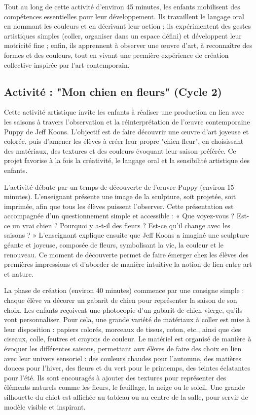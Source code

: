\documentclass[12pt]{article}
\begin{document}
Tout au long de cette activité d’environ 45 minutes, les enfants mobilisent des compétences essentielles pour leur développement. Ils travaillent le langage oral en nommant les couleurs et en décrivant leur action ; ils expérimentent des gestes artistiques simples (coller, organiser dans un espace défini) et développent leur motricité fine ; enfin, ils apprennent à observer une œuvre d’art, à reconnaître des formes et des couleurs, tout en vivant une première expérience de création collective inspirée par l’art contemporain.


\subsection*{Activité : "Mon chien en fleurs" (Cycle 2)}

Cette activité artistique invite les enfants à réaliser une production en lien avec les saisons à travers l’observation et la réinterprétation de l’œuvre contemporaine Puppy de Jeff Koons. L’objectif est de faire découvrir une œuvre d’art joyeuse et colorée, puis d’amener les élèves à créer leur propre "chien-fleur", en choisissant des matériaux, des textures et des couleurs évoquant leur saison préférée. Ce projet favorise à la fois la créativité, le langage oral et la sensibilité artistique des enfants.

L’activité débute par un temps de découverte de l’œuvre Puppy (environ 15 minutes). L’enseignant présente une image de la sculpture, soit projetée, soit imprimée, afin que tous les élèves puissent l’observer. Cette présentation est accompagnée d’un questionnement simple et accessible : « Que voyez-vous ? Est-ce un vrai chien ? Pourquoi y a-t-il des fleurs ? Est-ce qu’il change avec les saisons ? » L’enseignant explique ensuite que Jeff Koons a imaginé une sculpture géante et joyeuse, composée de fleurs, symbolisant la vie, la couleur et le renouveau. Ce moment de découverte permet de faire émerger chez les élèves des premières impressions et d’aborder de manière intuitive la notion de lien entre art et nature.

La phase de création (environ 40 minutes) commence par une consigne simple : chaque élève va décorer un gabarit de chien pour représenter la saison de son choix. Les enfants reçoivent une photocopie d’un gabarit de chien vierge, qu’ils vont personnaliser. Pour cela, une grande variété de matériaux à coller est mise à leur disposition : papiers colorés, morceaux de tissus, coton, etc., ainsi que des ciseaux, colle, feutres et crayons de couleur. Le matériel est organisé de manière à évoquer les différentes saisons, permettant aux élèves de faire des choix en lien avec leur univers sensoriel : des couleurs chaudes pour l’automne, des matières douces pour l’hiver, des fleurs et du vert pour le printemps, des teintes éclatantes pour l’été. Ils sont encouragés à ajouter des textures pour représenter des éléments naturels comme les fleurs, le feuillage, la neige ou le soleil. Une grande silhouette du chiot est affichée au tableau ou au centre de la salle, pour servir de modèle visible et inspirant.
\end{document}
